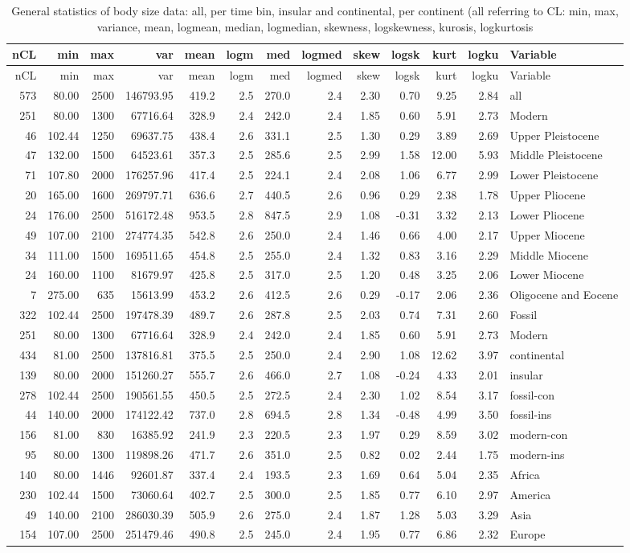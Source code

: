 \documentclass[]{article}
\begin{document}
\begin{longtable}[]{@{}rrrrrrrrrrrrl@{}}
\caption{General statistics of body size data: all, per time bin,
insular and continental, per continent (all referring to CL: min, max,
variance, mean, logmean, median, logmedian, skewness, logskewness,
kurosis, logkurtosis}\tabularnewline
\toprule
nCL & min & max & var & mean & logm & med & logmed & skew & logsk & kurt
& logku & Variable\tabularnewline
\midrule
\endfirsthead
\toprule
nCL & min & max & var & mean & logm & med & logmed & skew & logsk & kurt
& logku & Variable\tabularnewline
\midrule
\endhead
573 & 80.00 & 2500 & 146793.95 & 419.2 & 2.5 & 270.0 & 2.4 & 2.30 & 0.70
& 9.25 & 2.84 & all\tabularnewline
251 & 80.00 & 1300 & 67716.64 & 328.9 & 2.4 & 242.0 & 2.4 & 1.85 & 0.60
& 5.91 & 2.73 & Modern\tabularnewline
46 & 102.44 & 1250 & 69637.75 & 438.4 & 2.6 & 331.1 & 2.5 & 1.30 & 0.29
& 3.89 & 2.69 & Upper Pleistocene\tabularnewline
47 & 132.00 & 1500 & 64523.61 & 357.3 & 2.5 & 285.6 & 2.5 & 2.99 & 1.58
& 12.00 & 5.93 & Middle Pleistocene\tabularnewline
71 & 107.80 & 2000 & 176257.96 & 417.4 & 2.5 & 224.1 & 2.4 & 2.08 & 1.06
& 6.77 & 2.99 & Lower Pleistocene\tabularnewline
20 & 165.00 & 1600 & 269797.71 & 636.6 & 2.7 & 440.5 & 2.6 & 0.96 & 0.29
& 2.38 & 1.78 & Upper Pliocene\tabularnewline
24 & 176.00 & 2500 & 516172.48 & 953.5 & 2.8 & 847.5 & 2.9 & 1.08 &
-0.31 & 3.32 & 2.13 & Lower Pliocene\tabularnewline
49 & 107.00 & 2100 & 274774.35 & 542.8 & 2.6 & 250.0 & 2.4 & 1.46 & 0.66
& 4.00 & 2.17 & Upper Miocene\tabularnewline
34 & 111.00 & 1500 & 169511.65 & 454.8 & 2.5 & 255.0 & 2.4 & 1.32 & 0.83
& 3.16 & 2.29 & Middle Miocene\tabularnewline
24 & 160.00 & 1100 & 81679.97 & 425.8 & 2.5 & 317.0 & 2.5 & 1.20 & 0.48
& 3.25 & 2.06 & Lower Miocene\tabularnewline
7 & 275.00 & 635 & 15613.99 & 453.2 & 2.6 & 412.5 & 2.6 & 0.29 & -0.17 &
2.06 & 2.36 & Oligocene and Eocene\tabularnewline
322 & 102.44 & 2500 & 197478.39 & 489.7 & 2.6 & 287.8 & 2.5 & 2.03 &
0.74 & 7.31 & 2.60 & Fossil\tabularnewline
251 & 80.00 & 1300 & 67716.64 & 328.9 & 2.4 & 242.0 & 2.4 & 1.85 & 0.60
& 5.91 & 2.73 & Modern\tabularnewline
434 & 81.00 & 2500 & 137816.81 & 375.5 & 2.5 & 250.0 & 2.4 & 2.90 & 1.08
& 12.62 & 3.97 & continental\tabularnewline
139 & 80.00 & 2000 & 151260.27 & 555.7 & 2.6 & 466.0 & 2.7 & 1.08 &
-0.24 & 4.33 & 2.01 & insular\tabularnewline
278 & 102.44 & 2500 & 190561.55 & 450.5 & 2.5 & 272.5 & 2.4 & 2.30 &
1.02 & 8.54 & 3.17 & fossil-con\tabularnewline
44 & 140.00 & 2000 & 174122.42 & 737.0 & 2.8 & 694.5 & 2.8 & 1.34 &
-0.48 & 4.99 & 3.50 & fossil-ins\tabularnewline
156 & 81.00 & 830 & 16385.92 & 241.9 & 2.3 & 220.5 & 2.3 & 1.97 & 0.29 &
8.59 & 3.02 & modern-con\tabularnewline
95 & 80.00 & 1300 & 119898.26 & 471.7 & 2.6 & 351.0 & 2.5 & 0.82 & 0.02
& 2.44 & 1.75 & modern-ins\tabularnewline
140 & 80.00 & 1446 & 92601.87 & 337.4 & 2.4 & 193.5 & 2.3 & 1.69 & 0.64
& 5.04 & 2.35 & Africa\tabularnewline
230 & 102.44 & 1500 & 73060.64 & 402.7 & 2.5 & 300.0 & 2.5 & 1.85 & 0.77
& 6.10 & 2.97 & America\tabularnewline
49 & 140.00 & 2100 & 286030.39 & 505.9 & 2.6 & 275.0 & 2.4 & 1.87 & 1.28
& 5.03 & 3.29 & Asia\tabularnewline
154 & 107.00 & 2500 & 251479.46 & 490.8 & 2.5 & 245.0 & 2.4 & 1.95 &
0.77 & 6.86 & 2.32 & Europe\tabularnewline
\bottomrule
\end{longtable}
\end{document}
